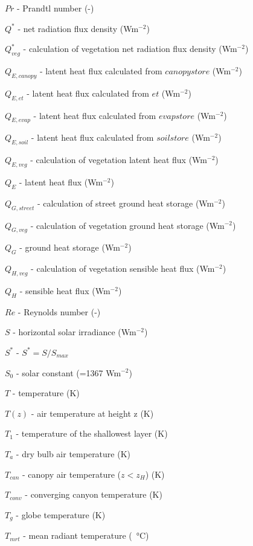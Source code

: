 {\begin{description}
\item $Pr$  -  Prandtl number (-) 
\item $Q^{*}$  -   net radiation flux density (Wm$^{-2}$) 
\item $Q^{*}_{veg}$  -   calculation of vegetation net radiation flux density (Wm$^{-2}$)
\item $Q_{E,canopy}$  -   latent heat flux calculated from $canopystore$ (Wm$^{-2}$) 
\item $Q_{E,et}$  -  latent heat flux calculated from $et$ (Wm$^{-2}$) 
\item $Q_{E,evap}$  -   latent heat flux calculated from $evapstore$ (Wm$^{-2}$) 
\item $Q_{E,soil}$  -   latent heat flux calculated from $soilstore$ (Wm$^{-2}$) 
\item $Q_{E,veg}$  -   calculation of vegetation latent heat flux (Wm$^{-2}$) 
\item $Q_{E}$  -   latent heat flux (Wm$^{-2}$)
\item $Q_{G,street}$  -   calculation of street ground heat storage (Wm$^{-2}$) 
\item $Q_{G,veg}$  -   calculation of vegetation ground heat storage (Wm$^{-2}$) 
\item $Q_{G}$  -   ground heat storage (Wm$^{-2}$) 
\item $Q_{H,veg}$  -     calculation of vegetation sensible heat flux (Wm$^{-2}$) 
\item $Q_{H}$  -     sensible heat flux (Wm$^{-2}$) 
\item $Re$  -  Reynolds number (-) 
\item $S$  -  horizontal solar irradiance (Wm$^{-2}$)  
\item $S^{*}$  -  $S^{*} = S/S_{max}$ 
\item $S_{0}$  -  solar constant (=1367 Wm$^{-2}$) 
\item $T$  -  temperature (K) 
\item $T(z)$  -   air temperature at height z (K) 
\item $T_{1}$  -  temperature of the shallowest layer (K) 
\item $T_{a}$  -  dry bulb air temperature (K) 
\item $T_{can}$  -    canopy air temperature ($z < z_{H}$) (K) 
\item $T_{conv}$  -   converging canyon temperature (K) 
\item $T_{g}$  -  globe temperature (K) 
\item $T_{mrt}$  -  mean radiant temperature (\SI{}{\degreeCelsius})  

\end{description}}
